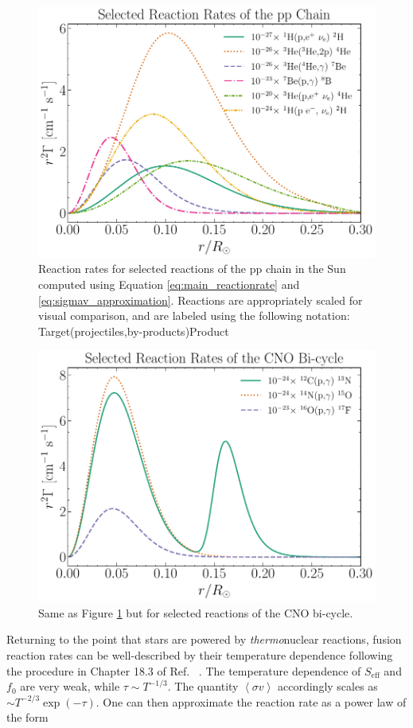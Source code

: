 \documentclass[12pt]{article}
\begin{document}
\begin{figure}
    \centering
    \includegraphics[width=0.75\linewidth]{Main Graphics/pp_rates.pdf}
    \caption{Reaction rates for selected reactions of the pp chain in the Sun computed using Equation \ref{eq:main_reactionrate} and \ref{eq:sigmav_approximation}. Reactions are appropriately scaled for visual comparison, and are labeled using the following notation: Target(projectiles,by-products)Product}
    \label{fig:pp_Reactions}
\end{figure}

\begin{figure}
    \centering
    \includegraphics[width=0.75\linewidth]{Main Graphics/cno_rates.pdf}
    \caption{Same as Figure \ref{fig:pp_Reactions} but for selected reactions of the CNO bi-cycle.}
    \label{fig:cno_Reactions}
\end{figure}

Returning to the point that stars are powered by \textit{thermo}nuclear reactions, fusion reaction rates can be well-described by their temperature dependence following the procedure in Chapter 18.3 of Ref.~\cite{KWW_book} . The temperature dependence of $S_\mathrm{eff}$ and $f_0$ are very weak, while $\tau \sim T^{-1/3}$. The quantity $\left<\sigma v \right>$ accordingly scales as $\sim T^{-2/3} \exp{(-\tau)}$. One can then approximate the reaction rate as a power law of the form
\end{document}
